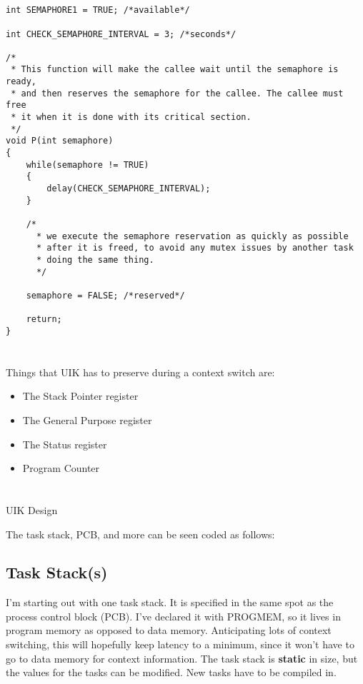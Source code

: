 \documentclass[11pt,letterpaper]{article}
\begin{document}
\section{}
\scriptsize
\begin{lstlisting}
int SEMAPHORE1 = TRUE; /*available*/

int CHECK_SEMAPHORE_INTERVAL = 3; /*seconds*/

/*
 * This function will make the callee wait until the semaphore is ready, 
 * and then reserves the semaphore for the callee. The callee must free 
 * it when it is done with its critical section.
 */
void P(int semaphore)
{
	while(semaphore != TRUE)
	{
		delay(CHECK_SEMAPHORE_INTERVAL);
	}

	/*
	  * we execute the semaphore reservation as quickly as possible
	  * after it is freed, to avoid any mutex issues by another task 
	  * doing the same thing.
	  */
	
	semaphore = FALSE; /*reserved*/

	return;
}
\end{lstlisting}
\normalsize


\pagebreak


\section{}
Things that UIK has to preserve during a context switch are:
\begin{itemize}
	\item The Stack Pointer register
	\item The General Purpose register
	\item The Status register
	\item Program Counter
\end{itemize}


\section{}
UIK Design

The task stack, PCB, and more can be seen coded as follows:
\scriptsize

\normalsize

\subsection{Task Stack(s)}
I'm starting out with one task stack. It is specified in the same spot as the process control block (PCB).
I've declared it with PROGMEM, so it lives in program memory as opposed to data memory. Anticipating
lots of context switching, this will hopefully keep latency to a minimum, since it won't have to go to 
data memory for context information. The task stack is \textbf{static} in size, but the values for the 
tasks can be modified. New tasks have to be compiled in.
\end{document}
